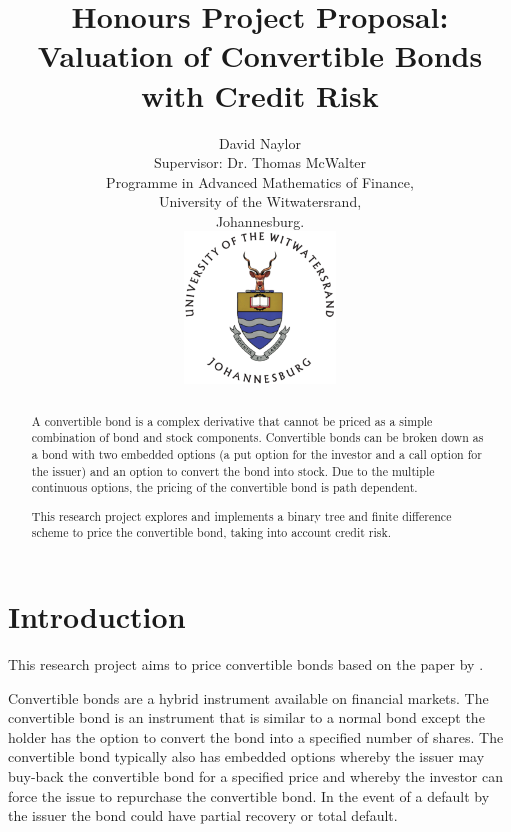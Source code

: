 \documentclass[a4paper,11pt,oneside]{article}
\title{Honours Project Proposal:\\
Valuation of Convertible Bonds with Credit Risk}
\author{David Naylor\\[1cm]
Supervisor: Dr. Thomas McWalter\\[3cm]
Programme in Advanced Mathematics of Finance,\\
University of the Witwatersrand,\\
Johannesburg.\\[2cm]
\includegraphics[width=4cm]{../common/WitsColourLogo}\\[2cm]
}
\newcommand{\setlinespacing}[1]
           {\renewcommand{\baselinestretch}{#1}\small\normalsize}
\begin{document}
\maketitle
\thispagestyle{empty}

\setlinespacing{1.20}
\newpage

\setcounter{page}{1}


\def\abstractname{\Large Abstract}
\begin{abstract}
A convertible bond is a complex derivative that cannot be priced as a simple combination of bond and stock components.  Convertible bonds can be broken down as a bond with two embedded options (a put option for the investor and a call option for the issuer) and an option to convert the bond into stock.  Due to the multiple continuous options, the pricing of the convertible bond is path dependent.

This research project explores and implements a binary tree and finite difference scheme to price the convertible bond, taking into account credit risk.
\end{abstract}



\section{Introduction}
This research project aims to price convertible bonds based on the paper by \citet{AFV03}.

Convertible bonds are a hybrid instrument available on financial markets.  The convertible bond is an instrument that is similar to a normal bond except the holder has the option to convert the bond into a specified number of shares.  The convertible bond typically also has embedded options whereby the issuer may buy-back the convertible bond for a specified price and whereby the investor can force the issue to repurchase the convertible bond.  In the event of a default by the issuer the bond could have partial recovery or total default.
\end{document}
